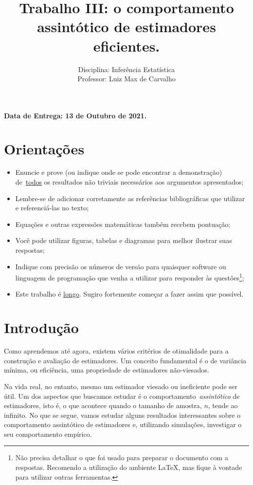 \documentclass[a4paper,10pt, notitlepage]{report}
\title{Trabalho III: o comportamento assintótico de estimadores eficientes.}
\author{Disciplina: Inferência Estatística \\ Professor: Luiz Max de Carvalho}
\begin{document}
\maketitle

\textbf{Data de Entrega: 13 de Outubro de 2021.}

\section*{Orientações}
\begin{itemize}
 \item Enuncie e prove (ou indique onde se pode encontrar a demonstração) de~\underline{todos} os resultados não triviais necessários aos argumentos apresentados;
 \item Lembre-se de adicionar corretamente as referências bibliográficas que utilizar e referenciá-las no texto;
 \item Equações e outras expressões matemáticas também recebem pontuação;
 \item Você pode utilizar figuras, tabelas e diagramas para melhor ilustrar suas respostas;
 \item Indique com precisão os números de versão para quaisquer software ou linguagem de programação que venha a utilizar para responder às questões\footnote{Não precisa detalhar o que foi usado para preparar o documento com a respostas. Recomendo a utilização do ambiente LaTeX, mas fique à vontade para utilizar outras ferramentas.};
 \item Este trabalho é \underline{longo}.
 Sugiro fortemente começar a fazer assim que possível.
 \end{itemize}


\section*{Introdução}

Como aprendemos até agora, existem vários critérios de otimalidade para a construção e avaliação de estimadores.
Um conceito fundamental é o de variância mínima, ou eficiência, uma propriedade de estimadores não-viesados.

Na vida real, no entanto, mesmo um estimador viesado ou ineficiente pode ser útil.
Um dos aspectos que buscamos estudar é o comportamento~\textit{assintótico} de estimadores, isto é, o que acontece quando o tamanho de amostra, $n$, tende ao infinito.
No que se segue, vamos estudar alguns resultados interessantes sobre o comportamento assintótico de estimadores e, utilizando simulações, investigar o seu comportamento empírico.
\end{document}
